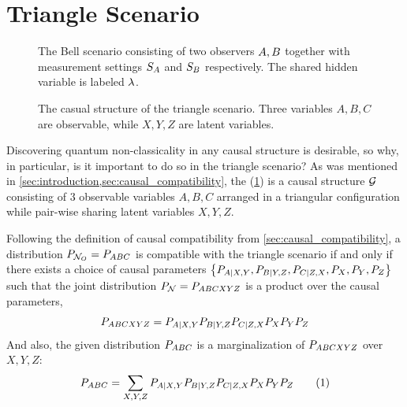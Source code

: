 \documentclass[aps, 10pt, english, twoside, pra, nofootinbib, tightenlines, longbibliography]{revtex4-1}
\begin{document}
    \section{Triangle Scenario}
    \label{sec:triangle_scenario}

    \begin{figure}
    \begin{center}
        \begin{minipage}[t]{.48\textwidth}
            \centering
            \scalebox{1.0}{}
            \caption{The Bell scenario consisting of two observers $A, B$ together with measurement settings $S_{A}$ and $S_{B}$ respectively. The shared hidden variable is labeled $\lambda$.}
            \label{fig:bell_scenario}
        \end{minipage}\hspace{0.04\textwidth}%
        \begin{minipage}[t]{.48\textwidth}
            \centering
            \scalebox{1.0}{}
            \caption{The casual structure of the triangle scenario. Three variables $A,B,C$ are observable, while $X, Y, Z$ are latent variables.}
            \label{fig:triangle_scenario}
        \end{minipage}
    \end{center}
    \end{figure}
    Discovering quantum non-classicality in any causal structure is desirable, so why, in particular, is it important to do so in the triangle scenario? As was mentioned in \cref{sec:introduction,sec:causal_compatibility}, the  (\cref{fig:triangle_scenario}) is a causal structure $\mathcal{G}$ consisting of $3$ observable variables $A, B, C$ arranged in a triangular configuration while pair-wise sharing latent variables $X, Y, Z$.

    Following the definition of causal compatibility from \cref{sec:causal_compatibility}, a distribution $\prob[\nodes_{O}] = \prob[ABC]$ is compatible with the triangle scenario if and only if there exists a choice of causal parameters $\bc{\prob[A|X,Y],\prob[B|Y,Z],\prob[C|Z,X],\prob[X],\prob[Y],\prob[Z]}$ such that the joint distribution $\prob[\nodes] = \prob[ABCXYZ]$ is a product over the causal parameters,
    \[ \prob[ABCXYZ] = \prob[A|X,Y]\prob[B|Y,Z]\prob[C|Z,X]\prob[X]\prob[Y]\prob[Z] \]
    And also, the given distribution $\prob[ABC]$ is a marginalization of $\prob[ABCXYZ]$ over $X, Y, Z$:
    \[ \prob[ABC] = \sum_{X,Y,Z}\prob[A|X,Y]\prob[B|Y,Z]\prob[C|Z,X]\prob[X]\prob[Y]\prob[Z] \eq \label{eq:triangle_compatibility} \]
\end{document}
